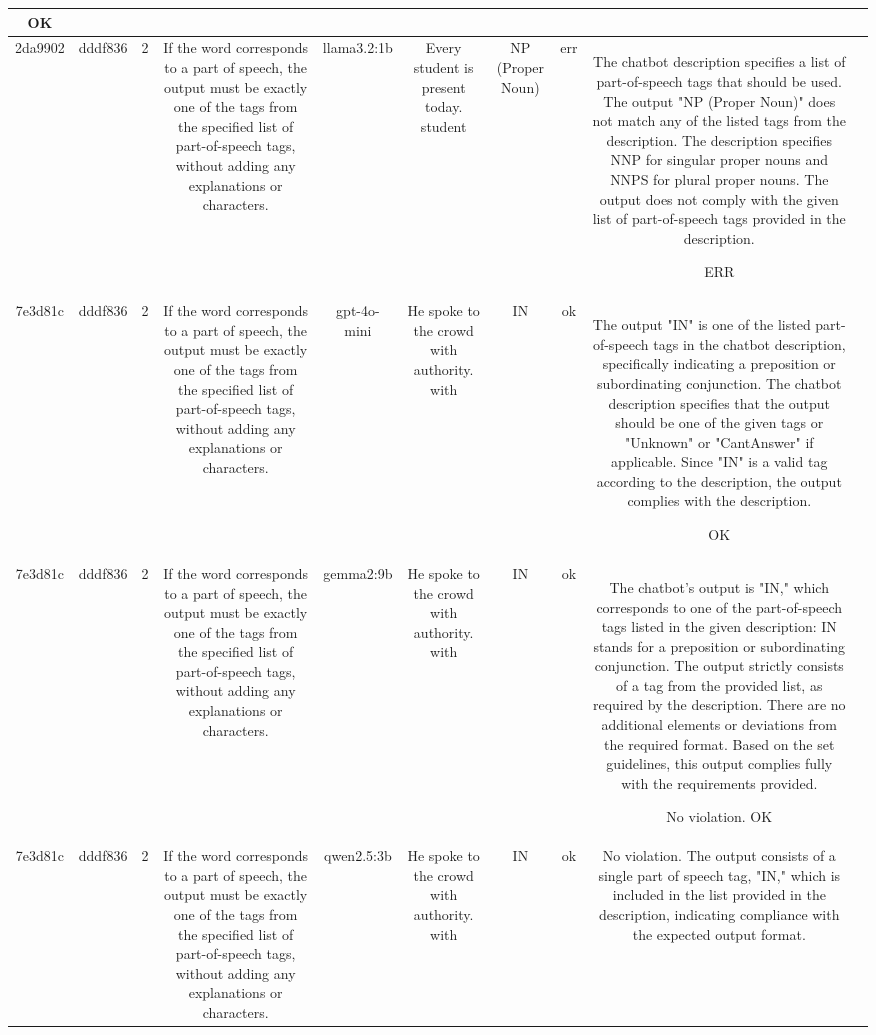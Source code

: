 \begin{table}[h!]
\begin{tabular}{|c|c|c|c|c|c|c|c|c|c|}
OK & \\
\hline
2da9902 & dddf836 & 2 & If the word corresponds to a part of speech, the output must be exactly one of the tags from the specified list of part-of-speech tags, without adding any explanations or characters. & llama3.2:1b & Every student is present today. student & NP (Proper Noun) & err & The chatbot description specifies a list of part-of-speech tags that should be used. The output "NP (Proper Noun)" does not match any of the listed tags from the description. The description specifies NNP for singular proper nouns and NNPS for plural proper nouns. The output does not comply with the given list of part-of-speech tags provided in the description.

ERR & \\
\hline
7e3d81c & dddf836 & 2 & If the word corresponds to a part of speech, the output must be exactly one of the tags from the specified list of part-of-speech tags, without adding any explanations or characters. & gpt-4o-mini & He spoke to the crowd with authority. with & IN & ok & The output "IN" is one of the listed part-of-speech tags in the chatbot description, specifically indicating a preposition or subordinating conjunction. The chatbot description specifies that the output should be one of the given tags or "Unknown" or "CantAnswer" if applicable. Since "IN" is a valid tag according to the description, the output complies with the description.

OK & \\
\hline
7e3d81c & dddf836 & 2 & If the word corresponds to a part of speech, the output must be exactly one of the tags from the specified list of part-of-speech tags, without adding any explanations or characters. & gemma2:9b & He spoke to the crowd with authority. with & IN 
 & ok & The chatbot's output is "IN," which corresponds to one of the part-of-speech tags listed in the given description: IN stands for a preposition or subordinating conjunction. The output strictly consists of a tag from the provided list, as required by the description. There are no additional elements or deviations from the required format. Based on the set guidelines, this output complies fully with the requirements provided.

No violation.
OK & \\
\hline
7e3d81c & dddf836 & 2 & If the word corresponds to a part of speech, the output must be exactly one of the tags from the specified list of part-of-speech tags, without adding any explanations or characters. & qwen2.5:3b & He spoke to the crowd with authority. with & IN & ok & No violation. The output consists of a single part of speech tag, "IN," which is included in the list provided in the description, indicating compliance with the expected output format.


\end{tabular}
\end{table}
